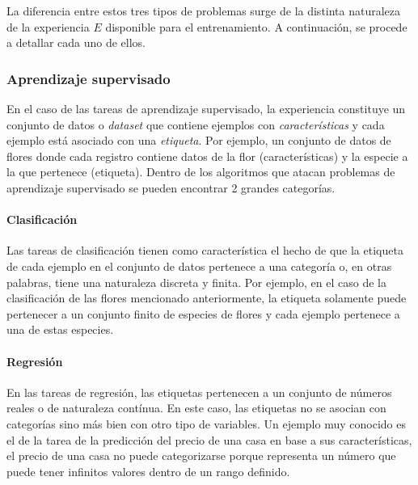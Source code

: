     La diferencia entre estos tres tipos de problemas surge de la distinta naturaleza de la experiencia $E$ disponible
    para el entrenamiento. A continuación, se procede a detallar cada uno de ellos.

        \subsubsection{Aprendizaje supervisado} \label{sss:supervisado}
        En el caso de las tareas de aprendizaje supervisado, la experiencia constituye un conjunto de datos o \textit{dataset}
        que contiene ejemplos con \textit{características} y cada ejemplo está asociado con una \textit{etiqueta}. Por ejemplo, 
        un conjunto de datos de flores donde cada registro contiene datos de la flor (características) y la especie a la que pertenece (etiqueta). 
        Dentro de los algoritmos que atacan problemas de aprendizaje supervisado se pueden encontrar 2 grandes categorías.
            \paragraph{Clasificación}
            Las tareas de clasificación tienen como característica el hecho de que la etiqueta de cada ejemplo en el 
            conjunto de datos pertenece a una categoría o, en otras palabras, tiene una naturaleza discreta y finita. Por ejemplo, 
            en el caso de la clasificación de las flores mencionado anteriormente, la etiqueta solamente puede pertenecer a un
            conjunto finito de especies de flores y cada ejemplo pertenece a una de estas especies.
            \paragraph{Regresión}
            En las tareas de regresión, las etiquetas pertenecen a un conjunto de números reales o de naturaleza 
            contínua. En este caso, las etiquetas no se asocian con categorías sino más bien con otro tipo de variables. Un 
            ejemplo muy conocido es el de la tarea de la predicción del precio de una casa en base a sus características, el precio 
            de una casa no puede categorizarse porque representa un número que puede tener infinitos valores dentro de un rango definido.
        

